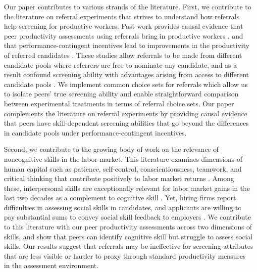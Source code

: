 \documentclass[11pt,a4paper,oneside]{article}
\begin{document}
Our paper contributes to various strands of the literature. First, we contribute to the literature on referral experiments that strives to understand how referrals help screening for productive workers. Past work provides causal evidence that peer productivity assessments using referrals bring in productive workers \citep{pallais_why_2016}, and that performance-contingent incentives lead to improvements in the productivity of referred candidates \citep{beaman_who_2012,beaman_job_2018}. These studies allow referrals to be made from different candidate pools where referrers are free to nominate any candidate, and as a result confound screening ability with advantages arising from access to different candidate pools \citep{montgomery_social_1991}. We implement common choice sets for referrals which allow us to isolate peers' true screening ability and enable straightforward comparison between experimental treatments in terms of referral choice sets. Our paper complements the literature on referral experiments by providing causal evidence that peers have skill-dependent screening abilities that go beyond the differences in candidate pools under performance-contingent incentives.

Second, we contribute to the growing body of work on the relevance of noncognitive skills in the labor market. This literature examines dimensions of human capital such as patience, self-control, conscientiousness, teamwork, and critical thinking that contribute positively to labor market returns \citep{heckman2006effects,lindqvist2011labor,heckman2012hard,weinberger2014increasing}. Among these, interpersonal skills are exceptionally relevant for labor market gains in the last two decades as a complement to cognitive skill \citep{deming2017growing,deming2023multidimensional}. Yet, hiring firms report difficulties in assessing social skills in candidates, and applicants are willing to pay substantial sums to convey social skill feedback to employers \citep{bassi2022screening}. We contribute to this literature with our peer productivity assessments across two dimensions of skills, and show that peers can identify cognitive skill but struggle to assess social skills. Our results suggest that referrals may be ineffective for screening attributes that are less visible or harder to proxy through standard productivity measures in the assessment environment.
\end{document}
